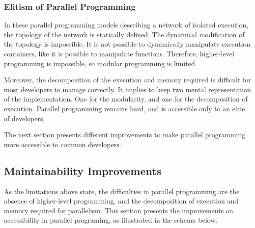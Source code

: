   






\subsubsection{Elitism of Parallel Programming}

In these parallel programming models describing a network of isolated execution, the topology of the network is statically defined. 
The dynamical modification of the topology is impossible.
It is not possible to dynamically manipulate execution containers, like it is possible to manipulate functions.
Therefore, higher-level programming is impossible, so modular programming is limited.

Moreover, the decomposition of the execution and memory required is difficult for most developers to manage correctly.
It implies to keep two mental representation of the implementation.
One for the modularity, and one for the decomposition of execution.
Parallel programming remains hard, and is accessible only to an elite of developers.

The next section presents different improvements to make parallel programming more accessible to common developers.

\subsection{Maintainability Improvements}


As the limitations above state, the difficulties in parallel programming are the absence of higher-level programming, and the decomposition of execution and memory required for parallelism.
This section presents the improvements on accessibility in parallel programing, as illustrated in the schema below.

